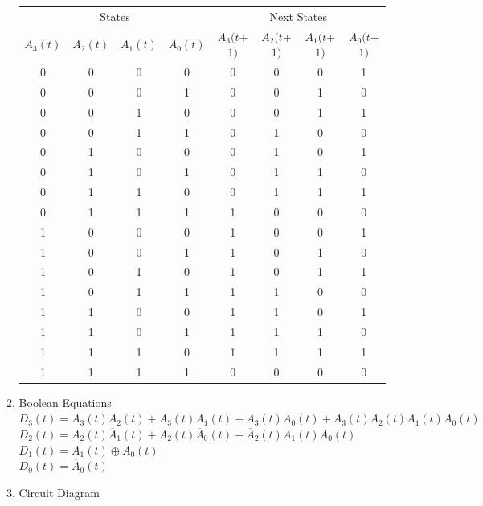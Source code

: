 \documentclass[a4paper]{article}
\begin{document}
\begin{enumerate}
\begin{enumerate}
        \begin{tabular}{cccc|cccc}
          \multicolumn{4}{c}{States} & \multicolumn{4}{|c}{Next States} \\
          $A_{3}(t)$ & $A_{2}(t)$ & $A_{1}(t)$ & $A_{0}(t)$ & $A_{3}(t$+$1)$ & $A_{2}(t$+$1)$ & $A_{1}(t$+$1)$ & $A_{0}(t$+$1)$ \\ \hline
          0 & 0 & 0 & 0 & 0 & 0 & 0 & 1 \\
          0 & 0 & 0 & 1 & 0 & 0 & 1 & 0 \\
          0 & 0 & 1 & 0 & 0 & 0 & 1 & 1 \\
          0 & 0 & 1 & 1 & 0 & 1 & 0 & 0 \\ \hline
          0 & 1 & 0 & 0 & 0 & 1 & 0 & 1 \\
          0 & 1 & 0 & 1 & 0 & 1 & 1 & 0 \\
          0 & 1 & 1 & 0 & 0 & 1 & 1 & 1 \\
          0 & 1 & 1 & 1 & 1 & 0 & 0 & 0 \\ \hline
          1 & 0 & 0 & 0 & 1 & 0 & 0 & 1 \\
          1 & 0 & 0 & 1 & 1 & 0 & 1 & 0 \\
          1 & 0 & 1 & 0 & 1 & 0 & 1 & 1 \\
          1 & 0 & 1 & 1 & 1 & 1 & 0 & 0 \\ \hline
          1 & 1 & 0 & 0 & 1 & 1 & 0 & 1 \\
          1 & 1 & 0 & 1 & 1 & 1 & 1 & 0 \\
          1 & 1 & 1 & 0 & 1 & 1 & 1 & 1 \\
          1 & 1 & 1 & 1 & 0 & 0 & 0 & 0 \\
        \end{tabular}

        \newpage
        \item Boolean Equations \\
        
        $D_{3}(t) = A_{3}(t)\overline{A}_{2}(t) + A_{3}(t)\overline{A}_{1}(t) + A_{3}(t)\overline{A}_{0}(t) + \overline{A}_{3}(t)A_{2}(t)A_{1}(t)A_{0}(t)$ \\
        $D_{2}(t) = A_{2}(t)\overline{A}_{1}(t) + A_{2}(t)\overline{A}_{0}(t) + \overline{A}_{2}(t)A_{1}(t)A_{0}(t)$ \\
        $D_{1}(t) = A_{1}(t) \oplus A_{0}(t)$ \\
        $D_{0}(t) = \overline{A}_{0}(t)$ \\

        \item Circuit Diagram \\


\end{enumerate}
\end{enumerate}
\end{document}
